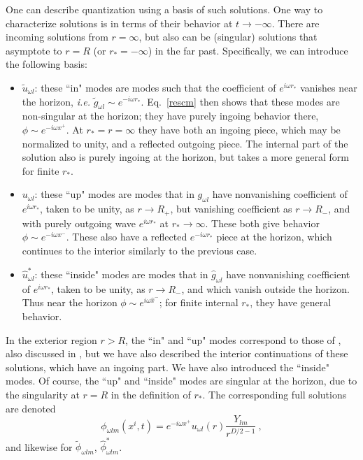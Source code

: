 \documentclass[12pt]{article}
\numberwithin{equation}{section}
\newcommand{\beq}{\begin{equation}}
\newcommand{\eeq}{\end{equation}}
\begin{document}
One can describe quantization using a basis of such solutions. One way to characterize solutions is in terms of their behavior at $t\rightarrow-\infty$.  There are incoming solutions from $r=\infty$, but also can be (singular) solutions that asymptote to $r=R$ (or $r_*=-\infty$) in the far past.  Specifically, we can introduce the following basis:
\begin{itemize}
\item{$\tilde u_{\omega l}$}: these ``in" modes are modes such that the coefficient of $e^{i\omega r_*}$ vanishes near the horizon, {\it i.e.} $\tilde g_{\omega l}\sim e^{-i\omega r_*}$.  Eq.~\eqref{rescm} then shows that these modes are non-singular at the horizon; they have purely ingoing behavior there, $\phi\sim e^{-i\omega x^+}$.  At $r_*=r=\infty$ they have both an ingoing piece, which may be normalized to unity, and a reflected outgoing piece.  The internal part of the solution also is purely ingoing at the horizon, but takes a more general form for finite $r_*$.    
\item{$u_{\omega l}$}: these ``up" modes are modes that in $g_{\omega l}$ have nonvanishing coefficient of $e^{i\omega r_*}$, taken to be unity, as $r\rightarrow R_+$, but vanishing coefficient as $r\rightarrow R_-$, and with purely outgoing wave $e^{i\omega r_*}$ at $r_*\rightarrow \infty$.  These both give behavior $\phi\sim e^{-i \omega x^-}$.  These also have a reflected $e^{-i\omega r_*}$ piece at the horizon, which continues to the interior similarly to the previous case. 
\item{$\hat u^*_{\omega l}$}:  these ``inside" modes are modes that in $\hat g_{\omega l}$ have nonvanishing coefficient of $e^{i\omega r_*}$, taken to be unity, as $r\rightarrow R_-$, and which vanish outside the horizon.  
Thus near the horizon $\phi\sim e^{i\omega \hat x^-}$; 
for finite internal $r_*$, they  have general behavior.
\end{itemize} 
In the exterior region $r>R$,  the ``in" and ``up" modes  correspond to those of \cite{ChMi}, also discussed in \cite{GiSh2}, but we have also described the interior continuations of these solutions, which have an  ingoing part.  We have also introduced the ``inside" modes.  
Of course, the ``up" and ``inside" modes are singular at the horizon, due to the singularity at $r=R$ in the definition of $r_*$.   The corresponding full solutions are denoted
\beq\label{EEigenmodes}
\phi_{\omega l m}(x^i,t) 
= e^{-i\omega x^+} u_{\omega l}(r)  \frac{Y_{lm}}{r^{D/2-1}}\ ,
\eeq
and likewise for $\tilde\phi_{\omega lm}$, $\hat\phi^*_{\omega lm}$. 
\end{document}
